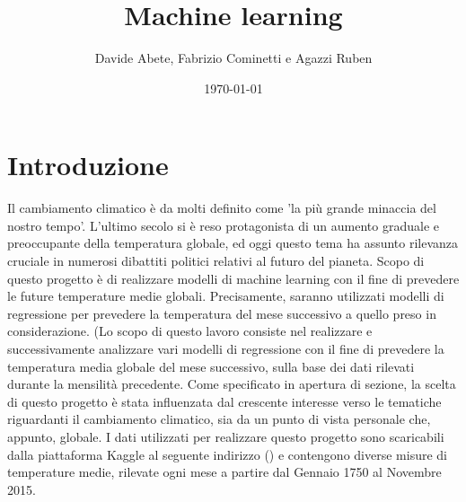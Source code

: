 \documentclass[12pt, a4paper, twocolumn]{article} %
\title{Machine learning} %
\author{
	Davide Abete, Fabrizio Cominetti e Agazzi Ruben %
}
\date{\today} %
\begin{document}
\maketitle %

\thispagestyle{firstpage} %

\tableofcontents 
{}



\section{Introduzione}
Il cambiamento climatico è da molti definito come 'la più grande minaccia del nostro tempo'.
L'ultimo secolo si è reso protagonista di un aumento graduale e preoccupante della temperatura globale, ed oggi questo tema ha assunto rilevanza cruciale in numerosi dibattiti politici relativi al futuro del pianeta.%
Scopo di questo progetto è di realizzare modelli di machine learning con il fine di prevedere le future temperature medie globali. Precisamente, saranno utilizzati modelli di regressione per prevedere la temperatura del mese successivo a quello preso in considerazione.
(Lo scopo di questo lavoro consiste nel realizzare e successivamente analizzare vari modelli di regressione con il fine di prevedere la temperatura media globale del mese successivo, sulla base dei dati rilevati durante la mensilità precedente.
Come specificato in apertura di sezione, la scelta di questo progetto è stata influenzata dal crescente interesse verso le tematiche riguardanti il cambiamento climatico, sia da un punto di vista personale che, appunto, globale.
I dati utilizzati per realizzare questo progetto sono scaricabili dalla piattaforma Kaggle al seguente indirizzo () e contengono diverse misure di temperature medie, rilevate ogni mese a partire dal Gennaio 1750 al Novembre 2015.
\end{document}
